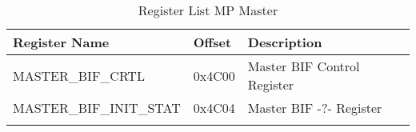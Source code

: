 \newpage
\begin{longtable}[c]{|m{}|C{0.10\textwidth}|m{0.42\textwidth}|} \hline
	Register Name & Offset & Description \\ \hline
	MASTER\_BIF\_CRTL & 0x4C00 & Master BIF Control Register \\ \hline
	MASTER\_BIF\_INIT\_STAT & 0x4C04 & Master BIF -?- Register \\ \hline
	\caption{Register List MP Master}
	\label{tab:reglist_mp_feature}
\end{longtable}
